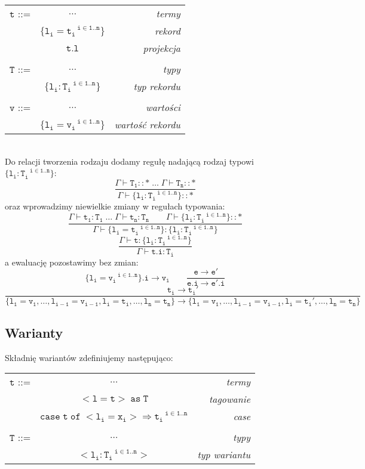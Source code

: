 \documentclass[11pt,leqno]{article}
\begin{document}
\begin{tabular}{| l c r |}
  \hline
  $\mathtt{t}$ ::= & $\dots$ & \textit{termy}  \\
   & $\mathtt{\{l_i=t_i^{\;\;\;i \in 1..n}\}}$ & \textit{rekord} \\
   & $\mathtt{t.l}$ & \textit{projekcja} \\ 
   & & \\
  $\mathtt{T}$ ::= & $\dots$ & \textit{typy}  \\
   & $\mathtt{\{l_i:T_i^{\;\;\;i \in 1..n}\}}$ & \textit{typ rekordu} \\
   & & \\
  $\mathtt{v}$ ::= & $\dots$ & \textit{wartości}  \\
   & $\mathtt{\{l_i=v_i^{\;\;\;i \in 1..n}\}}$ & \textit{wartość rekordu} \\
  \hline
\end{tabular} \\

Do relacji tworzenia rodzaju dodamy regułę nadającą rodzaj typowi $\mathtt{\{l_i:T_i^{\;\;\;i \in 1..n}\}}$:~\[\mathtt{
             \frac{\Gamma \vdash T_1::\ast \;\dots\;\Gamma \vdash T_n::\ast}{\Gamma \vdash \{l_i:T_i^{\;\;\;i \in 1..n}\}::\ast}
		}
	\]
oraz wprowadzimy niewielkie zmiany w regułach typowania:~\[\mathtt{
             \frac{\Gamma \vdash t_1:T_1 \;\dots\;\Gamma \vdash t_n:T_n \hspace{2em} \Gamma \vdash \{l_i:T_i^{\;\;\;i \in 1..n}\}::\ast}{\Gamma \vdash \{l_i=t_i^{\;\;\;i \in 1..n}\}:\{l_i:T_i^{\;\;\;i \in 1..n}\}}
            }
	\]
 	\[\mathtt{
           \frac{\Gamma \vdash t : \{l_i:T_i^{\;\;\;i \in 1..n}\}}{\Gamma \vdash t.i : T_i} 
            }
	\]
a ewaluację pozostawimy bez zmian: \\
 	\[\mathtt{
                \{l_i=v_i^{\;\;\;i \in 1..n}\}.i \longrightarrow v_i
                \qquad
                \frac{e \longrightarrow e'}{e.i \longrightarrow e'.i}
		}
	\]
\small{
 	\[\mathtt{
                \frac{t_i \longrightarrow t_i'}{\{l_1=v_1, \dots, l_{i-1}=v_{i-1}, l_i=t_i, \dots, l_n=t_n\} \longrightarrow \{l_1=v_1, \dots, l_{i-1}=v_{i-1}, l_i=t_i', \dots, l_n=t_n\}}
		}
	\]
}
\subsection{Warianty}

Składnię wariantów zdefiniujemy następująco:\\

\begin{tabular}{| l c r |}
  \hline
  $\mathtt{t}$ ::= & $\dots$ & \textit{termy}  \\
   & $\mathtt{<l=t>\;as\;T}$ & \textit{tagowanie} \\
   & $\mathtt{case\;t\;of\;<l_i=x_i>\Rightarrow t_i^{\;\;\;i \in 1..n}}$ & \textit{case}\\
   & & \\
  $\mathtt{T}$ ::= & $\dots$ & \textit{typy}  \\
   & $\mathtt{<l_i:T_i^{\;\;\;i \in 1..n}>}$ & \textit{typ wariantu}\\
  \hline
\end{tabular} \\
\end{document}
